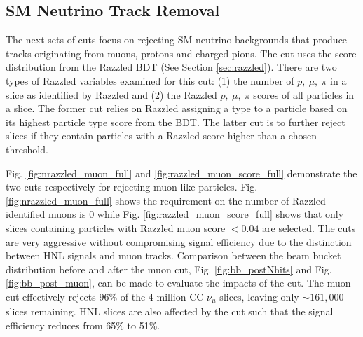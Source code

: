\subsection{SM Neutrino Track Removal}
\label{sec:trk_cut}

The next sets of cuts focus on rejecting SM neutrino backgrounds that produce tracks originating from muons, protons and charged pions.
The cut uses the score distribution from the Razzled BDT (See Section \ref{sec:razzled}).
There are two types of Razzled variables examined for this cut: (1) the number of $p, \ \mu, \ \pi$ in a slice as identified by Razzled and (2) the Razzled $p, \ \mu, \ \pi$ scores of all particles in a slice.
The former cut relies on Razzled assigning a type to a particle based on its highest particle type score from the BDT.
The latter cut is to further reject slices if they contain particles with a Razzled score higher than a chosen threshold.

Fig. \ref{fig:nrazzled_muon_full} and \ref{fig:razzled_muon_score_full} demonstrate the two cuts respectively for rejecting muon-like particles.
Fig. \ref{fig:nrazzled_muon_full} shows the requirement on the number of Razzled-identified muons is 0 while Fig. \ref{fig:razzled_muon_score_full} shows that only slices containing particles with Razzled muon score $< 0.04$ are selected.
The cuts are very aggressive without compromising signal efficiency due to the distinction between HNL signals and muon tracks.  
Comparison between the beam bucket distribution before and after the muon cut, Fig. \ref{fig:bb_postNhits} and Fig. \ref{fig:bb_post_muon}, can be made to evaluate the impacts of the cut.
The muon cut effectively rejects $96\%$ of the $4$ million CC $\nu_\mu$ slices, leaving only $\sim161,000$ slices remaining.
HNL slices are also affected by the cut such that the signal efficiency reduces from 65\% to 51\%.

